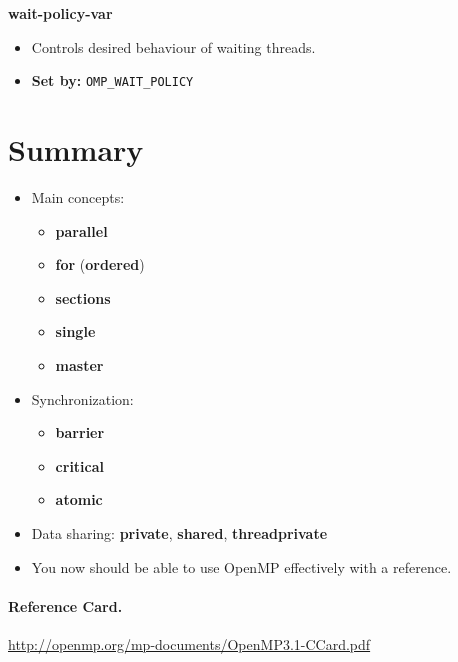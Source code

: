   {\bf wait-policy-var}
  \begin{itemize}
    \item Controls desired behaviour of waiting threads.
    \item {\bf Set by:} {\tt OMP\_WAIT\_POLICY}
  \end{itemize}

\section*{Summary}

  \begin{itemize}
    \item Main concepts:
      \begin{itemize}
        \item {\bf parallel}
        \item {\bf for} ({\bf ordered})
        \item {\bf sections}
        \item {\bf single}
        \item {\bf master}
      \end{itemize}
    \item Synchronization:
      \begin{itemize}
        \item {\bf barrier}
        \item {\bf critical}
        \item {\bf atomic}
      \end{itemize}
    \item Data sharing: {\bf private}, {\bf shared}, {\bf threadprivate}
    \item You now should be able to use OpenMP effectively with a reference.
  \end{itemize}

\paragraph{Reference Card.}

  \url{http://openmp.org/mp-documents/OpenMP3.1-CCard.pdf}



